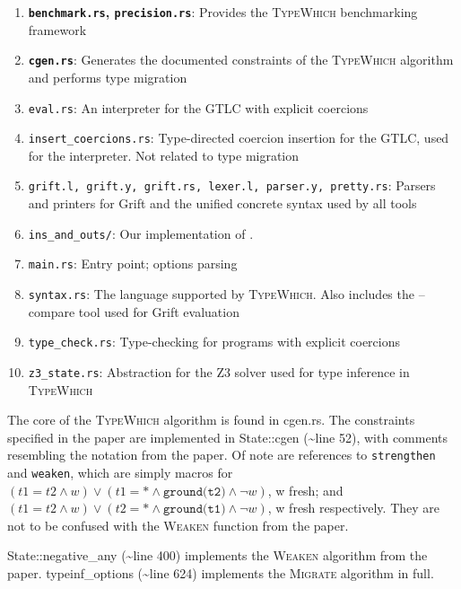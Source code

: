 \documentclass{book}
\newcommand{\system}{\textsc{TypeWhich}\xspace}
\begin{document}
\begin{enumerate}
    \item \textbf{\texttt{benchmark.rs}, \texttt{precision.rs}}: Provides the \system benchmarking
    framework
    \item \textbf{\texttt{cgen.rs}}: Generates the documented constraints of the \system
    algorithm and performs type migration
    \item \texttt{eval.rs}: An interpreter for the GTLC with explicit coercions
    \item \texttt{insert\_coercions.rs}: Type-directed coercion insertion for the GTLC,
    used for the interpreter. Not related to type migration
    \item \texttt{grift.l, grift.y, grift.rs, lexer.l, parser.y, pretty.rs}: Parsers and
    printers for Grift and the unified concrete syntax used by all tools
    \item \texttt{ins\_and\_outs/}: Our implementation of \citet{rastogi:gti}.
    \item \texttt{main.rs}: Entry point; options parsing
    \item \texttt{syntax.rs}: The language supported by \system. Also includes
    the --compare tool used for Grift evaluation
    \item \texttt{type\_check.rs}: Type-checking for programs with explicit coercions
    \item \texttt{z3\_state.rs}: Abstraction for the Z3 solver used for type inference
    in \system
\end{enumerate}

The core of the \system algorithm is found in cgen.rs. The constraints
specified in the paper are implemented in State::cgen (\textasciitilde{}line 52), with
comments resembling the notation from the paper. Of note are references to
\texttt{strengthen} and \texttt{weaken}, which are simply macros for
$(t1 = t2 \land w) \lor (t1 = * \land \texttt{ground(t2)} \land \neg w)$, w fresh; and
$(t1 = t2 \land w) \lor (t2 = * \land \texttt{ground(t1)} \land \neg w)$, w fresh
respectively. They are not to be confused with the \textsc{Weaken} function
from the paper.

State::negative\_any (\textasciitilde{}line 400) implements the \textsc{Weaken} algorithm from the paper.
typeinf\_options (\textasciitilde{}line 624) implements the \textsc{Migrate} algorithm in full.


\end{document}

